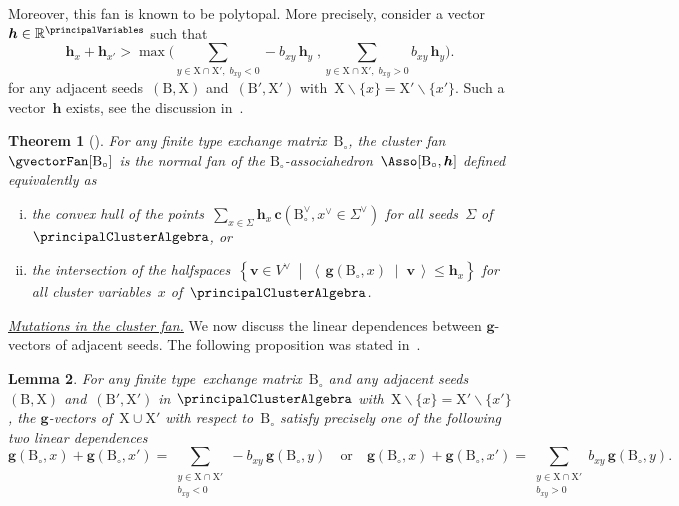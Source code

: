 \documentclass{amsart}
\newtheorem{theorem}{Theorem}[section]
\newtheorem{lemma}[theorem]{Lemma}
\theoremstyle{definition}
\newcommand{\R}{\mathbb{R}} %
\renewcommand{\b}[1]{{\boldsymbol{#1}}} %
\newcommand{\set}[2]{\left\{ #1 \;\middle|\; #2 \right\}} %
\newcommand{\ssm}{\smallsetminus} %
\newcommand{\dotprod}[2]{\left\langle \, #1 \; \middle| \; #2 \, \right\rangle} %
\newcommand{\darkblue}{\color{darkblue}} %
\newcommand{\defn}[1]{\textsl{\darkblue #1}} %
\newcommand{\para}[1]{\medskip\noindent\uline{\textit{#1.}}} %
\newcommand{\gvectorFull}[2]{\b{g}(#1,#2)} %
\newcommand{\cvectorFull}[3]{\mathbf{c}(#1,#3 \in #2)} %
\newcommand{\seed}{\Sigma} %
\newcommand{\cluster}{\mathrm{X}} %
\newcommand{\B}{\mathrm{B}} %
\begin{document}
Moreover, this fan is known to be polytopal.
More precisely, consider a vector~$\b{h} \in \R^{\principalVariables}$ such that
\[
\b{h}_x + \b{h}_{x'} > \max \Big( \sum_{{y \in \cluster \cap \cluster', \; b_{xy} < 0}} -b_{xy} \, \b{h}_y \;,  \sum_{{y \in \cluster \cap \cluster', \; b_{xy} > 0}} b_{xy} \, \b{h}_y \Big).
\]
for any adjacent seeds~$(\B, \cluster)$ and~$(\B', \cluster')$ with~$\cluster \ssm \{x\} = \cluster' \ssm \{x'\}$.
Such a vector~$\b{h}$ exists, see the discussion in~\cite[Prop.~28]{HohlwegPilaudStella}.

\begin{theorem}[{\cite[Thm.~26]{HohlwegPilaudStella}}]
\label{thm:generalizedAsso}
For any finite type exchange matrix~$\B_\circ$, the cluster fan~$\gvectorFan[\B_\circ]$ is the normal fan of the \defn{$\B_\circ$-associahedron}~$\Asso[\B_\circ, \b{h}]$ defined equivalently as
\begin{enumerate}[(i)]
\item the convex hull of the points~$\sum_{x \in \seed} \b{h}_x \, \cvectorFull{\B_\circ^\vee}{\seed^\vee}{x^\vee}$ for all seeds~$\seed$ of~$\principalClusterAlgebra$, or
\item the intersection of the halfspaces~$\set{\b{v} \in V^\vee}{\dotprod{\gvectorFull{\B_\circ}{x}}{\b{v}} \le \b{h}_x}$ for all cluster variables~$x$ of~$\principalClusterAlgebra$.
\end{enumerate}
\end{theorem}

\para{Mutations in the cluster fan}
%
We now discuss the linear dependences between $\b{g}$-vectors of adjacent seeds.
The following proposition was stated in~\cite[Lem.~19]{HohlwegPilaudStella}.

\begin{lemma}
\label{lem:linearDependencegvectorsCA}
For any finite type~exchange matrix~$\B_\circ$ and any adjacent seeds~${(\B, \cluster)}$ and~${(\B', \cluster')}$ in $\principalClusterAlgebra$ with~$\cluster \ssm \{x\} = \cluster' \ssm \{x'\}$, the $\b{g}$-vectors of~$\cluster \cup \cluster'$ with respect to~$\B_\circ$ satisfy precisely one of the following two linear dependences
\[
\gvectorFull{\B_\circ}{x} + \gvectorFull{\B_\circ}{x'} = \sum_{\substack{y \in \cluster \cap \cluster' \\ b_{xy} < 0}} -b_{xy} \, \gvectorFull{\B_\circ}{y}
\quad\text{or}\quad
\gvectorFull{\B_\circ}{x} + \gvectorFull{\B_\circ}{x'} = \sum_{\substack{y \in \cluster \cap \cluster' \\ b_{xy} > 0}} b_{xy} \, \gvectorFull{\B_\circ}{y}.
\]
\end{lemma}
\end{document}
